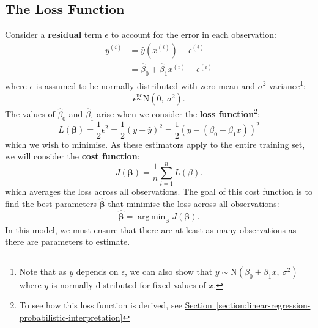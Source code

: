 \documentclass{article}
\DeclareMathOperator*{\argmin}{arg\,min}
\begin{document}
\subsection{The Loss Function}
Consider a \textbf{residual} term \(\epsilon\) to account for the error
in each observation:
\begin{align*}
    y^{\left( i \right)} & = \hat{y}\left( x^{\left( i \right)} \right) + \epsilon^{\left( i \right)}         \\
                         & = \hat{\beta}_0 + \hat{\beta}_1 x^{\left( i \right)} + \epsilon^{\left( i \right)}
\end{align*}
where \(\epsilon\) is assumed to be normally distributed with zero mean
and \(\sigma^2\) variance\footnote{Note that as \(y\) depends on \(\epsilon\), we can also show that \(y \sim \mathrm{N}\left( \beta_0 + \beta_1 x,\: \sigma^2 \right)\) where \(y\) is normally distributed for fixed values of \(x\).}:
\begin{equation*}
    \epsilon \overset{\mathrm{iid}}{\sim} \mathrm{N}\left( 0,\: \sigma^2 \right).
\end{equation*}
The values of \(\hat{\beta}_0\) and \(\hat{\beta}_1\) arise when we
consider the \textbf{loss function}\footnote{To see how this loss function is derived, see \hyperref[section:linear-regression-probabilistic-interpretation]{Section~\ref*{section:linear-regression-probabilistic-interpretation}}}:
\begin{equation*}
    L\left( \symbf{\beta} \right) = \frac{1}{2} \epsilon^2 = \frac{1}{2} {\left( y - \hat{y} \right)}^2 = \frac{1}{2} {\left( y - \left( \beta_0 + \beta_1 x \right) \right)}^2
\end{equation*}
which we wish to minimise. As these estimators apply to the entire
training set, we will consider the \textbf{cost function}:
\begin{equation*}
    J\left( \symbf{\beta} \right) = \frac{1}{n} \sum_{i = 1}^n L\left( \beta \right).
\end{equation*}
which averages the loss across all observations. The goal of this cost
function is to find the best parameters \(\hat{\symbf{\beta}}\) that minimise
the loss across all observations:
\begin{equation*}
    \hat{\symbf{\beta}} = \argmin_{\symbf{\beta}} J\left( \symbf{\beta} \right).
\end{equation*}
In this model, we must ensure that there are at least as many
observations as there are parameters to estimate.
\end{document}
